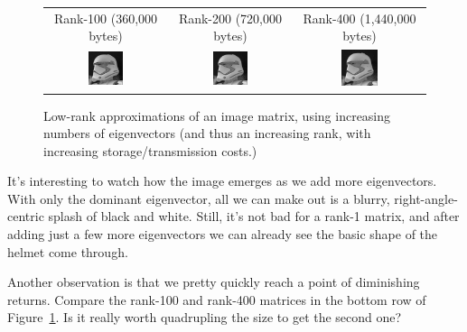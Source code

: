 \begin{alttitles}
\begin{figure}[H]
\begin{tabular}{ccc}
\scriptsize{Rank-100 (360,000 bytes)} &
\scriptsize{Rank-200 (720,000 bytes)} &
\scriptsize{Rank-400 (1,440,000 bytes)} \\
\includegraphics[width=0.3\textwidth]{approx100.png} &
\includegraphics[width=0.3\textwidth]{approx200.png} &
\includegraphics[width=0.3\textwidth]{approx400.png}\\
\end{tabular}
\caption{Low-rank approximations of an image matrix, using increasing numbers
of eigenvectors (and thus an increasing rank, with increasing
storage/transmission costs.)}
\label{fig:approximations}
\end{figure}

\pagebreak

It's interesting to watch how the image emerges as we add more eigenvectors.
With only the dominant eigenvector, all we can make out is a blurry,
right-angle-centric splash of black and white. Still, it's not bad for a rank-1
matrix, and after adding just a few more eigenvectors we can already see the
basic shape of the helmet come through.

Another observation is that we pretty quickly reach a point of diminishing
returns. Compare the rank-100 and rank-400 matrices in the bottom row of
Figure~\ref{fig:approximations}. Is it really worth quadrupling the size to get
the second one?


\end{alttitles}
